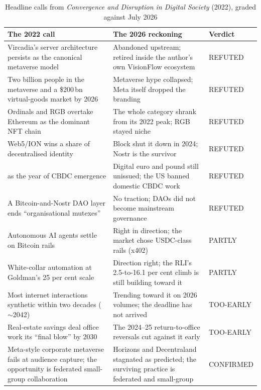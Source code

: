\begin{table}[ht]
\centering
\caption{Headline calls from \textit{Convergence and Disruption in Digital Society} (2022), graded against July 2026}
\label{tab:wager}
\begin{tabularx}{\textwidth}{L{4.6cm} X L{2.4cm}}
\toprule
\textbf{The 2022 call} & \textbf{The 2026 reckoning} & \textbf{Verdict} \\
\midrule
Vircadia's server architecture persists as the canonical metaverse model & Abandoned upstream; retired inside the author's own VisionFlow ecosystem & REFUTED \\
\addlinespace
Two billion people in the metaverse and a \$200\,bn virtual-goods market by 2026 & Metaverse hype collapsed; Meta itself dropped the branding & REFUTED \\
\addlinespace
Ordinals and RGB overtake Ethereum as the dominant NFT chain & The whole category shrank from its 2022 peak; RGB stayed niche & REFUTED \\
\addlinespace
Web5/ION wins a share of decentralised identity & Block shut it down in 2024; Nostr is the survivor & REFUTED \\
 as the year of CBDC emergence & Digital euro and pound still unissued; the US banned domestic CBDC work & REFUTED \\
\addlinespace
A Bitcoin-and-Nostr DAO layer ends ``organisational mutexes'' & No traction; DAOs did not become mainstream governance & REFUTED \\
\addlinespace
Autonomous AI agents settle on Bitcoin rails & Right in direction; the market chose USDC-class rails (x402) & PARTLY \\
\addlinespace
White-collar automation at Goldman's 25 per cent scale & Direction right; the RLI's 2.5-to-16.1 per cent climb is still building toward it & PARTLY \\
\addlinespace
Most internet interactions synthetic within two decades ($\sim$2042) & Trending toward it on 2026 volumes; the deadline has not arrived & TOO-EARLY \\
\addlinespace
Real-estate savings deal office work its ``final blow'' by 2030 & The 2024--25 return-to-office reversals cut against it early & TOO-EARLY \\
\addlinespace
Meta-style corporate metaverse fails at audience capture; the opportunity is federated small-group collaboration & Horizons and Decentraland stagnated as predicted; the surviving practice is federated and small-group & CONFIRMED \\

\end{tabularx}
\end{table}
